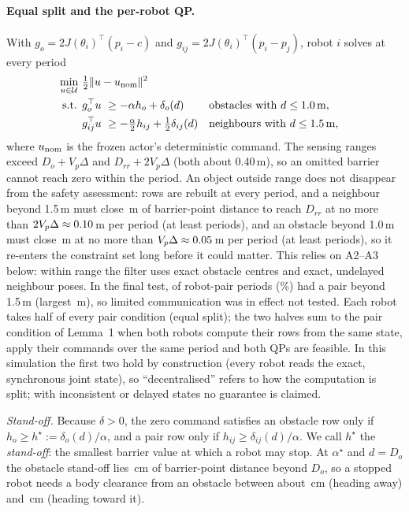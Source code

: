 \documentclass[11pt]{article}
\begin{document}
\paragraph{Equal split and the per-robot QP.} With $g_o=2J(\theta_i)^\top(p_i-c)$ and
$g_{ij}=2J(\theta_i)^\top(p_i-p_j)$, robot $i$ solves at every period
\begin{equation}
\begin{aligned}
\min_{u\in\mathcal U}\ & \tfrac12\|u-u_{\rm nom}\|^2\\
\text{s.t. }& g_o^\top u\ \ge -\alpha h_o+\delta_o(d) && \text{obstacles with } d\le 1.0\,\mathrm{m},\\
& g_{ij}^\top u\ \ge -\tfrac{\alpha}{2}h_{ij}+\tfrac12\delta_{ij}(d) && \text{neighbours with } d\le 1.5\,\mathrm{m},
\end{aligned}
\end{equation}
where $u_{\rm nom}$ is the frozen actor's deterministic command. The sensing ranges exceed
$D_o+V_p\Delta$ and $D_{rr}+2V_p\Delta$ (both about 0.40\,m), so an omitted barrier cannot reach zero
within the period. An object outside range does not disappear from the safety assessment: rows are
rebuilt at every period, and a neighbour beyond 1.5\,m must close \CommGapPair\,m of barrier-point
distance to reach $D_{rr}$ at no more than $2V_p\Delta\approx0.10$\,m per period (at least
\CommPeriodsPair{} periods), and an obstacle beyond 1.0\,m must close \CommGapObst\,m at no more than
$V_p\Delta\approx0.05$\,m per period (at least \CommPeriodsObst{} periods), so it re-enters the
constraint set long before it could matter. This relies on A2--A3 below: within range the filter uses
exact obstacle centres and exact, undelayed neighbour poses. In the final test, \CommBeyond{} of
\CommPairPeriods{} robot-pair periods (\CommBeyondPct\%) had a pair beyond 1.5\,m (largest
\CommMaxPair\,m), so limited communication was in effect not tested. Each robot takes half of every pair condition (equal split); the two halves sum to the pair
condition of Lemma~1 when both robots compute their rows from the same state, apply their commands over
the same period and both QPs are feasible. In this simulation the first two hold by construction (every
robot reads the exact, synchronous joint state), so ``decentralised'' refers to how the computation is
split; with inconsistent or delayed states no guarantee is claimed.

\emph{Stand-off.} Because $\delta>0$, the zero command satisfies an obstacle row only if
$h_o\ge h^\star:=\delta_o(d)/\alpha$, and a pair row only if $h_{ij}\ge\delta_{ij}(d)/\alpha$. We call
$h^\star$ the \emph{stand-off}: the smallest barrier value at which a robot may stop. At $\alpha^\star$
and $d=D_o$ the obstacle stand-off lies \StandOffObstCm\,cm of barrier-point distance beyond $D_o$, so a
stopped robot needs a body clearance from an obstacle between about \CoverBandLoCm\,cm (heading away)
and \CoverBandHiCm\,cm (heading toward it).
\end{document}
